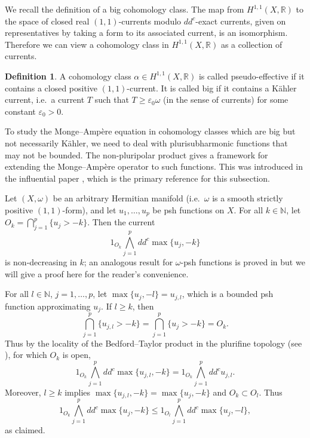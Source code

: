 \documentclass[a4paper]{amsart}
\newcommand{\R}{\mathbb{R}}
\newcommand{\N}{\mathbb{N}}
\theoremstyle{definition}
\newtheorem{definition}[theorem]{Definition}
\begin{document}
We recall the definition of a big cohomology class. The map from $H^{1, 1}(X, \R)$ to the space of closed real $(1, 1)$-currents modulo $dd^c$-exact currents, given on representatives by taking a form to its associated current, is an isomorphism. Therefore we can view a cohomology class in $H^{1, 1}(X, \R)$ as a collection of currents.
\begin{definition}\label{def: big}
	A cohomology class $\alpha\in H^{1, 1}(X, \R)$ is called pseudo-effective if it contains a closed positive $(1, 1)$-current. It is called big if it contains a K\"ahler current, i.e.\ a current $T$ such that $T\ge \varepsilon_0 \omega$ (in the sense of currents) for some constant $\varepsilon_0 >0$.
\end{definition}
To study the Monge--Amp\`ere equation in cohomology classes which are big but not necessarily K\"ahler, we need to deal with plurisubharmonic functions that may not be bounded. The non-pluripolar product gives a framework for extending the Monge--Amp\`ere operator to such functions. This was introduced in the influential paper \cite{BEGZ}, which is the primary reference for this subsection.

Let $(X, \omega)$ be an arbitrary Hermitian manifold (i.e.\ $\omega$ is a smooth strictly positive $(1, 1)$-form), and let $u_1, \dots, u_p$ be psh functions on $X$. For all $k\in \N$, let $O_k = \bigcap_{j=1}^p \{u_j > -k\}$. Then the current 
\[1_{O_k}\bigwedge_{j=1}^p dd^c\max\{u_j, -k\}\]
is non-decreasing in $k$; an analogous result for $\omega$-psh functions is proved in \cite{qpshenergy} but we will give a proof here for the reader's convenience.

For all $l \in \N$, $j=1, \dots, p$, let $\max\{u_j, -l\} = u_{j,l}$, which is a bounded psh function approximating $u_j$. If $l \ge k$, then \[\bigcap_{j=1}^p\{u_{j,l} > -k\} = \bigcap_{j=1}^p\{u_j > -k\} = O_k.\] Thus by the locality of the Bedford--Taylor product in the plurifine topology (see \cite{plurifine}), for which $O_k$ is open,
\[1_{O_k}\bigwedge_{j=1}^p dd^c\max\{u_{j,l}, -k\} = 1_{O_k}\bigwedge_{j=1}^p dd^c u_{j,l}.\]
Moreover, $l\ge k$ implies $\max\{u_{j, l},-k\} = \max\{u_j, -k\}$ and $O_k \subset O_l$. Thus
\[1_{O_k}\bigwedge_{j=1}^p dd^c\max\{u_j, -k\} \le 1_{O_l}\bigwedge_{j=1}^p dd^c\max\{u_j, -l\},\]
as claimed.
\end{document}
